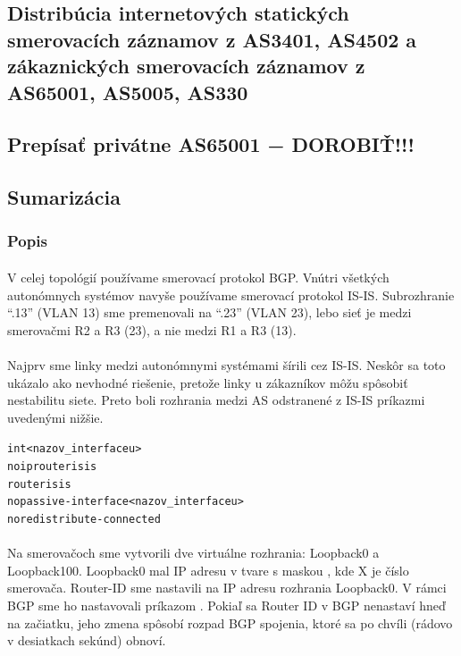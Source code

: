 \documentclass[12pt,twoside,a4paper]{report}
\begin{document}
\subsection{Distribúcia internetových statických smerovacích záznamov z AS3401, AS4502 a zákaznických smerovacích záznamov z AS65001, AS5005, AS330}
\subsection{Prepísať privátne AS65001 − DOROBIŤ!!!}
\subsection{Sumarizácia}


\subsubsection{Popis}
\paragraph{}
V celej topológií používame smerovací protokol BGP. Vnútri všetkých autonómnych systémov navyše používame smerovací protokol IS-IS. Subrozhranie “.13” (VLAN 13) sme premenovali na “.23” (VLAN 23), lebo sieť je medzi smerovačmi R2 a R3 (23), a nie medzi R1 a R3 (13).

\paragraph{}
Najprv sme linky medzi autonómnymi systémami šírili cez IS-IS. Neskôr sa toto ukázalo ako nevhodné riešenie, pretože  linky u zákazníkov môžu spôsobiť nestabilitu siete. Preto boli rozhrania medzi AS odstranené z IS-IS príkazmi uvedenými nižšie.

\noindent
{\selectfont
\begin{small}
\begin{alltt}
int <nazov_interfaceu>
  no ip router isis
router isis
  no passive-interface <nazov_interfaceu>
  no redistribute-connected
\end{alltt}
\end{small}
}

\paragraph{}
Na smerovačoch sme vytvorili dve virtuálne rozhrania: Loopback0 a Loopback100. Loopback0 mal IP adresu v tvare  s maskou , kde X je číslo smerovača. Router-ID sme nastavili na IP adresu rozhrania Loopback0. V rámci BGP sme ho nastavovali príkazom . Pokiaľ sa Router ID v BGP nenastaví hneď na začiatku, jeho zmena spôsobí rozpad BGP spojenia, ktoré sa po chvíli (rádovo v desiatkach sekúnd) obnoví.
\end{document}
